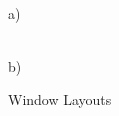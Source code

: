 \begin{figure}[htpb]
    \centering
    \begin{minipage}{.49\linewidth}
        \\ a)
    \end{minipage}
    \begin{minipage}{.49\linewidth}
        \vspace{13ex}
        \\ b)
    \end{minipage}
    \caption{Window Layouts}
    \label{fig:window_layouts}
\end{figure}

